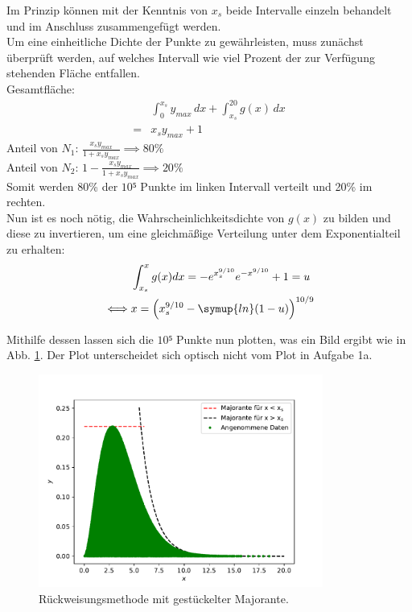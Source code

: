       Im Prinzip können mit der Kenntnis von $x_s$ beide Intervalle einzeln
      behandelt und im Anschluss zusammengefügt werden. \\
      Um eine einheitliche Dichte der Punkte zu gewährleisten,
      muss zunächst überprüft werden, auf welches Intervall wie viel Prozent
      der zur Verfügung stehenden Fläche entfallen. \\
      Gesamtfläche:
      \begin{align*}
        &\int_0^{x_s}y_{max}\,dx+\int_{x_s}^{20}g(x)\,dx\\
        =&x_sy_{max}+1
      \end{align*}
      Anteil von $N_1$: $\frac{x_sy_{max}}{1+x_sy_{max}} \implies 80\%$\\
      Anteil von $N_2$: $1-\frac{x_sy_{max}}{1+x_sy_{max}} \implies 20\%$\\
      Somit werden 80\% der $10⁵$ Punkte im linken Intervall verteilt und
      20\% im rechten.\\
      Nun ist es noch nötig, die Wahrscheinlichkeitsdichte von $g(x)$ zu bilden
      und diese zu invertieren, um eine gleichmäßige Verteilung unter dem
      Exponentialteil zu erhalten:
      \begin{align*}
        &\int_{x_s}^x g(x)dx=-e^{x_s^{9/10}}e^{-x^{9/10}}+1 = u\\
        \iff&x=\left(x_s^{9/10}-\symup{ln}(1-u)\right)^{10/9}
      \end{align*}

      Mithilfe dessen lassen sich die $10⁵$ Punkte nun plotten, was
      ein Bild ergibt wie in Abb. \ref{fig:majorante}.
      Der Plot unterscheidet sich optisch nicht vom Plot in Aufgabe 1a.



      \begin{figure}[H]
        \centering
        \includegraphics[height=7cm]{majorante.pdf}
        \caption{Rückweisungsmethode mit gestückelter Majorante.}
        \label{fig:majorante}
      \end{figure}




